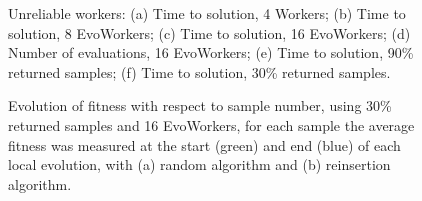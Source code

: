 \begin{figure}[t]
{        \label{fig:plot_percent_90}
    }
    \caption{Unreliable workers: (a) Time to solution, 4 Workers; (b) Time to solution, 8 EvoWorkers;
    (c) Time to solution, 16 EvoWorkers; (d) Number of evaluations, 16 EvoWorkers; (e) Time to solution, 90\% returned samples;
    (f) Time to solution, 30\% returned samples. }
    \label{fig:effort_unreliable}
\end{figure}


\begin{figure}[t]
    \centering
    \caption{Evolution of fitness with respect to sample number, using 30\% returned samples and 16 EvoWorkers,
    for each sample the average fitness was measured at the start (green) and end (blue) of each local evolution, with (a) random algorithm and
    (b) reinsertion algorithm. }
    \label{fig:effort_unreliable2}
\end{figure}


